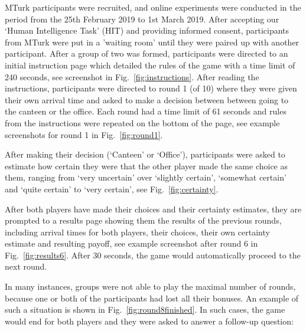 \documentclass[a4paper,superscriptaddress,nofootinbib]{revtex4}
\begin{document}
MTurk participants were recruited, and online experiments were conducted in the period from the 25th February 2019 to 1st March 2019. After accepting
our `Human Intelligence Task' (HIT) and providing informed consent, participants from MTurk were put in a ’waiting room’ until they were paired up with another participant. After a group of two was formed, participants were directed to an initial instruction page which detailed the rules of the game with a time limit of 240 seconds, see screenshot in Fig.~\ref{fig:instructions}.
After reading the instructions, participants were directed to round 1 (of 10) where they were given their own arrival time and asked to make a decision between between going to the canteen or the office. Each round had a time limit of 61 seconds and rules from the instructions were repeated on the bottom of the page, see example screenshots for round 1 in Fig.~\ref{fig:round1}.

After making their decision (`Canteen' or `Office'), participants were asked to estimate how certain they were that the other player made the same choice as them, ranging from `very uncertain' over `slightly certain', `somewhat certain' and `quite certain' to `very certain', see Fig.~\ref{fig:certainty}.

After both players have made their choices and their certainty estimates, they are prompted to a results page showing them the results of the previous rounds, including arrival times for both players, their choices, their own certainty estimate and resulting payoff, see example screenshot after round 6 in Fig.~\ref{fig:results6}. After 30 seconds, the game would automatically proceed to the next round.

In many instances, groups were not able to play the maximal number of rounds, because one or both of the participants had lost all their bonuses. An example of such a situation is shown in Fig.~\ref{fig:round8finished}. In such cases, the game would end for both players and they were asked to answer a follow-up question: 
\end{document}
